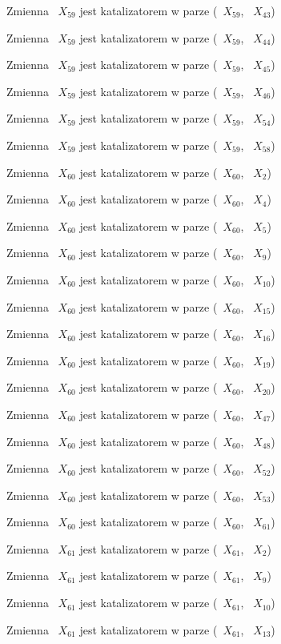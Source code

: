 \documentclass{article}
\begin{document}
Zmienna ~$X_{59}$ jest katalizatorem w parze (~$X_{59}$, ~$X_{43}$)

Zmienna ~$X_{59}$ jest katalizatorem w parze (~$X_{59}$, ~$X_{44}$)

Zmienna ~$X_{59}$ jest katalizatorem w parze (~$X_{59}$, ~$X_{45}$)

Zmienna ~$X_{59}$ jest katalizatorem w parze (~$X_{59}$, ~$X_{46}$)

Zmienna ~$X_{59}$ jest katalizatorem w parze (~$X_{59}$, ~$X_{54}$)

Zmienna ~$X_{59}$ jest katalizatorem w parze (~$X_{59}$, ~$X_{58}$)

Zmienna ~$X_{60}$ jest katalizatorem w parze (~$X_{60}$, ~$X_{2}$)

Zmienna ~$X_{60}$ jest katalizatorem w parze (~$X_{60}$, ~$X_{4}$)

Zmienna ~$X_{60}$ jest katalizatorem w parze (~$X_{60}$, ~$X_{5}$)

Zmienna ~$X_{60}$ jest katalizatorem w parze (~$X_{60}$, ~$X_{9}$)

Zmienna ~$X_{60}$ jest katalizatorem w parze (~$X_{60}$, ~$X_{10}$)

Zmienna ~$X_{60}$ jest katalizatorem w parze (~$X_{60}$, ~$X_{15}$)

Zmienna ~$X_{60}$ jest katalizatorem w parze (~$X_{60}$, ~$X_{16}$)

Zmienna ~$X_{60}$ jest katalizatorem w parze (~$X_{60}$, ~$X_{19}$)

Zmienna ~$X_{60}$ jest katalizatorem w parze (~$X_{60}$, ~$X_{20}$)

Zmienna ~$X_{60}$ jest katalizatorem w parze (~$X_{60}$, ~$X_{47}$)

Zmienna ~$X_{60}$ jest katalizatorem w parze (~$X_{60}$, ~$X_{48}$)

Zmienna ~$X_{60}$ jest katalizatorem w parze (~$X_{60}$, ~$X_{52}$)

Zmienna ~$X_{60}$ jest katalizatorem w parze (~$X_{60}$, ~$X_{53}$)

Zmienna ~$X_{60}$ jest katalizatorem w parze (~$X_{60}$, ~$X_{61}$)

Zmienna ~$X_{61}$ jest katalizatorem w parze (~$X_{61}$, ~$X_{2}$)

Zmienna ~$X_{61}$ jest katalizatorem w parze (~$X_{61}$, ~$X_{9}$)

Zmienna ~$X_{61}$ jest katalizatorem w parze (~$X_{61}$, ~$X_{10}$)

Zmienna ~$X_{61}$ jest katalizatorem w parze (~$X_{61}$, ~$X_{13}$)
\end{document}
